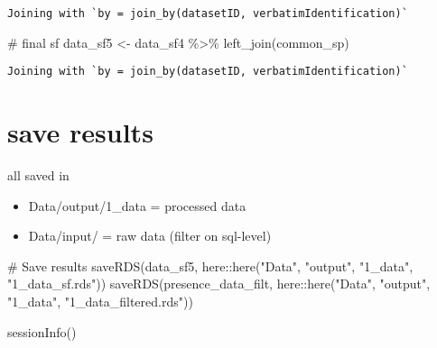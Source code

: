\documentclass[
  letterpaper,
  DIV=11,
  numbers=noendperiod]{scrreprt}
\newenvironment{Shaded}{\begin{snugshade}}{\end{snugshade}}
\newcommand{\CommentTok}[1]{\textcolor[rgb]{0.37,0.37,0.37}{#1}}
\newcommand{\FunctionTok}[1]{\textcolor[rgb]{0.28,0.35,0.67}{#1}}
\newcommand{\NormalTok}[1]{\textcolor[rgb]{0.00,0.23,0.31}{#1}}
\newcommand{\OtherTok}[1]{\textcolor[rgb]{0.00,0.23,0.31}{#1}}
\newcommand{\SpecialCharTok}[1]{\textcolor[rgb]{0.37,0.37,0.37}{#1}}
\newcommand{\StringTok}[1]{\textcolor[rgb]{0.13,0.47,0.30}{#1}}
\begin{document}
\begin{verbatim}
Joining with `by = join_by(datasetID, verbatimIdentification)`
\end{verbatim}

\begin{Shaded}
\begin{Highlighting}[]
\CommentTok{\# final sf}
\NormalTok{data\_sf5 }\OtherTok{\textless{}{-}}\NormalTok{ data\_sf4 }\SpecialCharTok{\%\textgreater{}\%}
  \FunctionTok{left\_join}\NormalTok{(common\_sp)}
\end{Highlighting}
\end{Shaded}

\begin{verbatim}
Joining with `by = join_by(datasetID, verbatimIdentification)`
\end{verbatim}

\hypertarget{save-results}{%
\section{save results}\label{save-results}}

all saved in

\begin{itemize}
\item
  Data/output/1\_data = processed data
\item
  Data/input/ = raw data (filter on sql-level)
\end{itemize}

\begin{Shaded}
\begin{Highlighting}[]
\CommentTok{\# Save results}
\FunctionTok{saveRDS}\NormalTok{(data\_sf5, here}\SpecialCharTok{::}\FunctionTok{here}\NormalTok{(}\StringTok{"Data"}\NormalTok{, }\StringTok{"output"}\NormalTok{, }\StringTok{"1\_data"}\NormalTok{, }\StringTok{"1\_data\_sf.rds"}\NormalTok{))}
\FunctionTok{saveRDS}\NormalTok{(presence\_data\_filt, here}\SpecialCharTok{::}\FunctionTok{here}\NormalTok{(}\StringTok{"Data"}\NormalTok{, }\StringTok{"output"}\NormalTok{,  }\StringTok{"1\_data"}\NormalTok{, }\StringTok{"1\_data\_filtered.rds"}\NormalTok{))}
\end{Highlighting}
\end{Shaded}

\begin{Shaded}
\begin{Highlighting}[]
\FunctionTok{sessionInfo}\NormalTok{()}
\end{Highlighting}
\end{Shaded}
\end{document}
